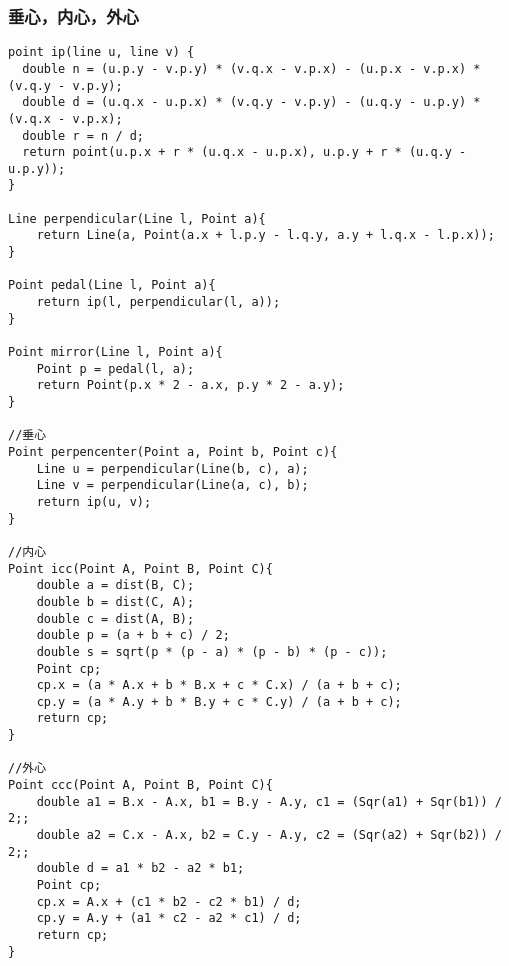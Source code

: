 \subsubsection{垂心，内心，外心}
\begin{verbatim}
point ip(line u, line v) {
  double n = (u.p.y - v.p.y) * (v.q.x - v.p.x) - (u.p.x - v.p.x) * (v.q.y - v.p.y);
  double d = (u.q.x - u.p.x) * (v.q.y - v.p.y) - (u.q.y - u.p.y) * (v.q.x - v.p.x);
  double r = n / d;
  return point(u.p.x + r * (u.q.x - u.p.x), u.p.y + r * (u.q.y - u.p.y));
}

Line perpendicular(Line l, Point a){
	return Line(a, Point(a.x + l.p.y - l.q.y, a.y + l.q.x - l.p.x));
}

Point pedal(Line l, Point a){
	return ip(l, perpendicular(l, a));
}

Point mirror(Line l, Point a){
	Point p = pedal(l, a);
	return Point(p.x * 2 - a.x, p.y * 2 - a.y);
}

//垂心
Point perpencenter(Point a, Point b, Point c){
	Line u = perpendicular(Line(b, c), a);
	Line v = perpendicular(Line(a, c), b);
	return ip(u, v);
}

//内心
Point icc(Point A, Point B, Point C){
	double a = dist(B, C);
	double b = dist(C, A);
	double c = dist(A, B);
	double p = (a + b + c) / 2;
	double s = sqrt(p * (p - a) * (p - b) * (p - c));
	Point cp;
	cp.x = (a * A.x + b * B.x + c * C.x) / (a + b + c);
	cp.y = (a * A.y + b * B.y + c * C.y) / (a + b + c);
	return cp;
}

//外心
Point ccc(Point A, Point B, Point C){
	double a1 = B.x - A.x, b1 = B.y - A.y, c1 = (Sqr(a1) + Sqr(b1)) / 2;;
	double a2 = C.x - A.x, b2 = C.y - A.y, c2 = (Sqr(a2) + Sqr(b2)) / 2;;
	double d = a1 * b2 - a2 * b1;
	Point cp;
	cp.x = A.x + (c1 * b2 - c2 * b1) / d;
	cp.y = A.y + (a1 * c2 - a2 * c1) / d;
	return cp;
}
\end{verbatim}
